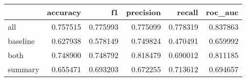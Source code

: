\begin{tabular}{lrrrrr}
\toprule
{} &  accuracy &        f1 &  precision &    recall &   roc\_auc \\
\midrule
all      &  0.757515 &  0.775993 &   0.775099 &  0.778319 &  0.837863 \\
baseline &  0.627938 &  0.578149 &   0.749824 &  0.470491 &  0.659992 \\
both     &  0.748900 &  0.748792 &   0.818479 &  0.690012 &  0.811185 \\
summary  &  0.655471 &  0.693203 &   0.672255 &  0.713612 &  0.694657 \\
\bottomrule
\end{tabular}
